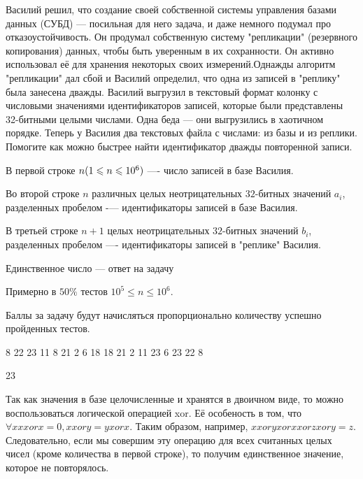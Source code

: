 
Василий решил, что создание своей собственной системы управления базами данных (СУБД) — посильная для него задача, и даже немного подумал про отказоустойчивость. Он продумал собственную систему "репликации" (резервного копирования) данных, чтобы быть уверенным в их сохранности. Он активно использовал её для хранения некоторых своих измерений.Однажды алгоритм "репликации" дал сбой и Василий определил, что одна из записей в "реплику" была занесена дважды. Василий выгрузил в текстовый формат колонку с числовыми значениями идентификаторов записей, которые были представлены 32-битными целыми числами. Одна беда — они выгрузились в хаотичном порядке. Теперь у Василия два текстовых файла с числами: из базы и из реплики. Помогите как можно быстрее найти идентификатор дважды повторенной записи.


В первой строке $ n\space (1\leq n \leq 10^6) $ —- число записей в базе Василия.

Во второй строке $ n $ различных целых неотрицательных $ 32 $-битных значений $ a_i $, разделенных пробелом -— идентификаторы записей в базе Василия.

В третьей строке $ n+1 $ целых неотрицательных $ 32 $-битных значений $ b_i $, разделенных пробелом —- идентификаторы записей в "реплике" Василия. 

\outputfmtSection

Единственное число — ответ на задачу

\markSection

Примерно в $ 50\% $ тестов $ 10^5\leq n \leq 10^6 $.

Баллы за задачу будут начисляться пропорционально количеству успешно пройденных тестов.


\begin{myverbbox}[\small]{\vinput}
    8
    22 23 11 8 21 2 6 18
    18 21 2 11 23 6 23 22 8
\end{myverbbox}

\begin{myverbbox}[\small]{\voutput}
    23
\end{myverbbox}

\solutionSection
Так как значения в базе целочисленные и хранятся в двоичном виде, то можно воспользоваться логической операцией xor. Её особеность в том, что $\forall x x xor x = 0, x xor y = y xor x$. Таким образом, например, $x xor y xor x xor z xor y = z$. Следовательно, если мы совершим эту операцию для всех считанных целых чисел (кроме количества в первой строке), то получим единственное значение, которое не повторялось.

